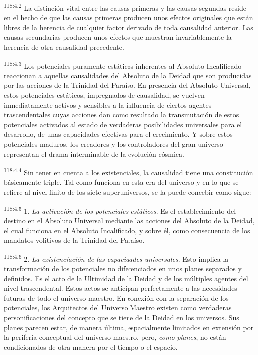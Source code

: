 \documentclass[twoside, 11pt]{book}
\begin{document}
\par
\textsuperscript{118:4.2} La distinción vital entre las causas primeras y las causas segundas reside en el hecho de que las causas primeras producen unos efectos originales que están libres de la herencia de cualquier factor derivado de toda causalidad anterior. Las causas secundarias producen unos efectos que muestran invariablemente la herencia de otra causalidad precedente.

\par
\textsuperscript{118:4.3} Los potenciales puramente estáticos inherentes al Absoluto Incalificado reaccionan a aquellas causalidades del Absoluto de la Deidad que son producidas por las acciones de la Trinidad del Paraíso. En presencia del Absoluto Universal, estos potenciales estáticos, impregnados de causalidad, se vuelven inmediatamente activos y sensibles a la influencia de ciertos agentes trascendentales cuyas acciones dan como resultado la transmutación de estos potenciales activados al estado de verdaderas posibilidades universales para el desarrollo, de unas capacidades efectivas para el crecimiento. Y sobre estos potenciales maduros, los creadores y los controladores del gran universo representan el drama interminable de la evolución cósmica.

\par
\textsuperscript{118:4.4} Sin tener en cuenta a los existenciales, la causalidad tiene una constitución básicamente triple. Tal como funciona en esta era del universo y en lo que se refiere al nivel finito de los siete superuniversos, se la puede concebir como sigue:

\par
\textsuperscript{118:4.5} 1. \textit{La activación de los potenciales estáticos}. Es el establecimiento del destino en el Absoluto Universal mediante las acciones del Absoluto de la Deidad, el cual funciona en el Absoluto Incalificado, y sobre él, como consecuencia de los mandatos volitivos de la Trinidad del Paraíso.

\par
\textsuperscript{118:4.6} 2. \textit{La existenciación de las capacidades universales}. Esto implica la transformación de los potenciales no diferenciados en unos planes separados y definidos. Es el acto de la Ultimidad de la Deidad y de los múltiples agentes del nivel trascendental. Estos actos se anticipan perfectamente a las necesidades futuras de todo el universo maestro. En conexión con la separación de los potenciales, los Arquitectos del Universo Maestro existen como verdaderas personificaciones del concepto que se tiene de la Deidad en los universos. Sus planes parecen estar, de manera última, espacialmente limitados en extensión por la periferia conceptual del universo maestro, pero, \textit{como planes}, no están condicionados de otra manera por el tiempo o el espacio.
\end{document}
